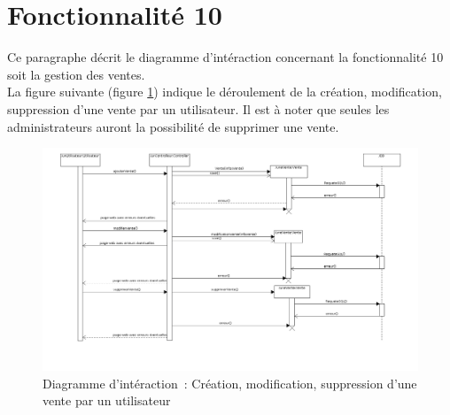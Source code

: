 \section{Fonctionnalité 10}
Ce paragraphe décrit le diagramme d'intéraction concernant la fonctionnalité 10 soit la gestion des ventes. \\

La figure suivante (figure \ref{diagrammeInteraction3}) indique le déroulement de la création, modification, suppression d’une vente par un utilisateur. Il est à noter que seules les administrateurs auront la possibilité de supprimer une vente.
\begin{figure}[H]
	\centering
	\includegraphics[scale=0.35]{images/diagrammesInteraction/03_diagrammeInteractionF10.png}
	\caption{Diagramme d'intéraction~: Création, modification, suppression d’une vente par un utilisateur}
	\label{diagrammeInteraction3}
\end{figure}



